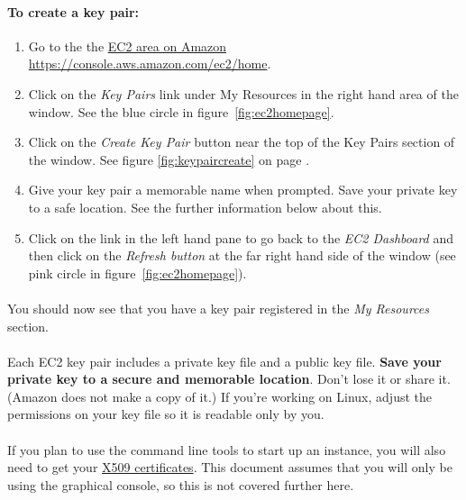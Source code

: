 \paragraph{To create a key pair:}
\begin{enumerate}
\item Go to the the \href{https://console.aws.amazon.com/ec2/home}{EC2 area on Amazon https://console.aws.amazon.com/ec2/home}.
\item Click on the \emph{Key Pairs} link under My Resources in the right hand area of the window. See the blue circle in figure~\ref{fig:ec2homepage}.
\item Click on the \emph{Create Key Pair} button near the top of the Key Pairs section of the window. See figure \ref{fig:keypaircreate} on page \pageref{fig:keypaircreate}.
\item Give your key pair a memorable name when prompted. Save your private key to a safe location. See the further information below about this. 
\item Click on the link in the left hand pane to go back to the \emph{EC2 Dashboard} and then click on the \emph{Refresh button} at the far right hand side of the window (see pink circle in figure~\ref{fig:ec2homepage}). 
\end{enumerate}

\paragraph{}You should now see that you have a key pair registered in the \emph{My Resources} section. 

\paragraph{}Each EC2 key pair includes a private key file and a public key file. \textbf{Save your private key to a secure and memorable location}. Don't lose it or share it. (Amazon does not make a copy of it.) If you're working on Linux, adjust the permissions on your key file so it is readable only by you. 

\paragraph{}If you plan to use the command line tools to start up an instance, you will also need to get your \href{http://docs.amazonwebservices.com/AWSSecurityCredentials/1.0/AboutAWSCredentials.html#X509Credentials}{X509 certificates}. This document assumes that you will only be using the graphical console, so this is not covered further here. 

